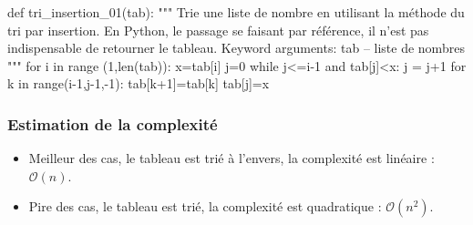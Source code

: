 \documentclass[10pt]{article}
\begin{document}
\begin{minipage}[c]{.48\linewidth}
\begin{py}
\begin{python}
def tri_insertion_01(tab):
    """ 
    Trie une liste de nombre en utilisant la méthode 
    du tri par insertion.
    En Python, le passage se faisant par référence, il 
    n'est pas indispensable de retourner le tableau.
    Keyword arguments:
    tab -- liste de nombres
    """
    for i in range (1,len(tab)):
        x=tab[i]
        j=0
        while j<=i-1 and tab[j]<x:
            j = j+1
        for k in range(i-1,j-1,-1):
            tab[k+1]=tab[k]
        tab[j]=x
\end{python}
\end{py}
\end{minipage}

\subsubsection*{Estimation de la complexité}
\begin{itemize}
\item Meilleur des cas, le tableau est trié à l'envers, la complexité est linéaire : $\mathcal{O}(n)$.
\item Pire des cas, le tableau est trié, la complexité est quadratique : $\mathcal{O}(n^2)$.
\end{itemize}
\end{document}
